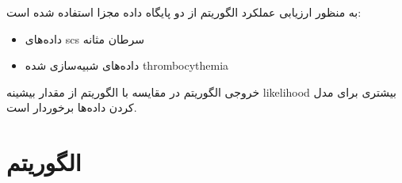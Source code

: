 به منظور ارزیابی عملکرد الگوریتم  از دو پایگاه داده مجزا استفاده شده است: 
\begin{itemize}
	\item داده‌های \gls{scs} سرطان مثانه
    \item داده‌های شبیه‌سازی شده \gls{thrombocythemia} 
\end{itemize}
خروجی الگوریتم در مقایسه با الگوریتم  از مقدار بیشینه \gls{likelihood} بیشتری برای مدل کردن داده‌ها برخوردار است. 


\section{الگوریتم  \cite{satas2020scarlet}}

%
%

